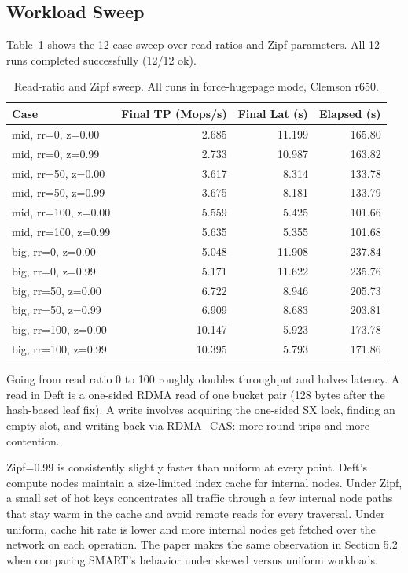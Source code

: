 \documentclass[10pt]{article}
\begin{document}
\subsection{Workload Sweep}

Table~\ref{tab:sweep} shows the 12-case sweep over read ratios and Zipf parameters.
All 12 runs completed successfully (12/12 ok).

\begin{table}[h]
\centering
\small
\caption{Read-ratio and Zipf sweep. All runs in force-hugepage mode, Clemson r650.}
\label{tab:sweep}
\begin{tabular}{lrrr}
\toprule
Case & Final TP (Mops/s) & Final Lat (\textmu{}s) & Elapsed (s) \\
\midrule
mid,  rr=0,   z=0.00 & 2.685  & 11.199 & 165.80 \\
mid,  rr=0,   z=0.99 & 2.733  & 10.987 & 163.82 \\
mid,  rr=50,  z=0.00 & 3.617  &  8.314 & 133.78 \\
mid,  rr=50,  z=0.99 & 3.675  &  8.181 & 133.79 \\
mid,  rr=100, z=0.00 & 5.559  &  5.425 & 101.66 \\
mid,  rr=100, z=0.99 & 5.635  &  5.355 & 101.68 \\
big,  rr=0,   z=0.00 & 5.048  & 11.908 & 237.84 \\
big,  rr=0,   z=0.99 & 5.171  & 11.622 & 235.76 \\
big,  rr=50,  z=0.00 & 6.722  &  8.946 & 205.73 \\
big,  rr=50,  z=0.99 & 6.909  &  8.683 & 203.81 \\
big,  rr=100, z=0.00 & 10.147 &  5.923 & 173.78 \\
big,  rr=100, z=0.99 & 10.395 &  5.793 & 171.86 \\
\bottomrule
\end{tabular}
\end{table}

Going from read ratio 0 to 100 roughly doubles throughput and halves latency.
A read in Deft is a one-sided RDMA read of one bucket pair (128 bytes after the
hash-based leaf fix).
A write involves acquiring the one-sided SX lock, finding an empty slot, and writing
back via RDMA\_CAS: more round trips and more contention.

Zipf=0.99 is consistently slightly faster than uniform at every point.
Deft's compute nodes maintain a size-limited index cache for internal nodes.
Under Zipf, a small set of hot keys concentrates all traffic through a few internal
node paths that stay warm in the cache and avoid remote reads for every traversal.
Under uniform, cache hit rate is lower and more internal nodes get fetched over
the network on each operation.
The paper makes the same observation in Section 5.2 when comparing SMART's behavior
under skewed versus uniform workloads.
\end{document}
